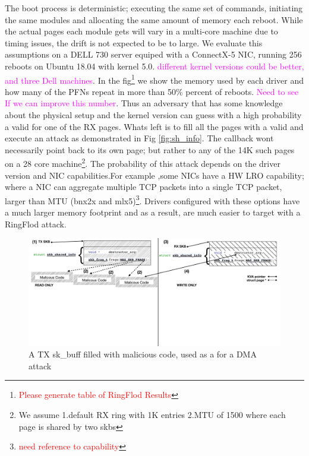 The boot process is deterministic; executing the same set of commands, initiating the same modules and allocating the same amount of memory each reboot. While the actual pages each module gets will vary in a multi-core machine due to timing issues, the drift is not expected to be to large. We evaluate this assumptions on a DELL 730 server equiped with a ConnectX-5 NIC, running 256 reboots on Ubuntu 18.04 with kernel 5.0. \textcolor{magenta}{different kernel versions could be better, and three Dell machines}. In the fig\footnote{\textcolor{red}{Please generate table of RingFlod Results}} we show the memory used by each driver and how many of the PFNs repeat in more than 50\% percent of reboots. \textcolor{magenta}{Need to see If we can improve this number}. Thus an adversary that has some knowledge about the physical setup and the kernel version can guess with a high probability a valid \kva for one of the RX pages. Whats left is to fill all the pages with a valid \mabaf and execute an attack as demonstrated in Fig \ref{fig:sh_info}. The callback wont necessarily point back to its own page; but rather to any of the 14K such pages on a 28 core machine\footnote{We assume 1.default RX ring with 1K entries 2.MTU of 1500 where each page is shared by two skbs}. The probability of this attack depends on the driver version and NIC capabilities.For example ,some NICs have a HW LRO capability; where a NIC can aggregate multiple TCP packets into a single TCP packet, larger than MTU (bnx2x and mlx5)\footnote{\textcolor{red}{need reference to capability}}. Drivers configured with these options have a much larger memory footprint and as a result, are much easier to target with a RingFlod attack.
\begin{figure}[t]
    \centering
    \includegraphics[width=1.1\linewidth]{figs/accomplice.pdf}
    \caption{A TX sk\_buff filled with malicious code, used as a \means for a DMA attack}
    \label{fig:payload}
\end{figure}
